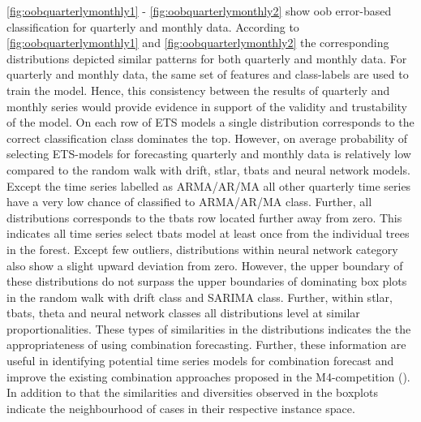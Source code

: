 \documentclass[11pt,a4paper,]{article}
\begin{document}
\autoref{fig:oobquarterlymonthly1} - \autoref{fig:oobquarterlymonthly2}
show oob error-based classification for quarterly and monthly data.
According to \autoref{fig:oobquarterlymonthly1} and
\autoref{fig:oobquarterlymonthly2} the corresponding distributions
depicted similar patterns for both quarterly and monthly data. For
quarterly and monthly data, the same set of features and class-labels
are used to train the model. Hence, this consistency between the results
of quarterly and monthly series would provide evidence in support of the
validity and trustability of the model. On each row of ETS models a
single distribution corresponds to the correct classification class
dominates the top. However, on average probability of selecting
ETS-models for forecasting quarterly and monthly data is relatively low
compared to the random walk with drift, stlar, tbats and neural network
models. Except the time series labelled as ARMA/AR/MA all other
quarterly time series have a very low chance of classified to ARMA/AR/MA
class. Further, all distributions corresponds to the tbats row located
further away from zero. This indicates all time series select tbats
model at least once from the individual trees in the forest. Except few
outliers, distributions within neural network category also show a
slight upward deviation from zero. However, the upper boundary of these
distributions do not surpass the upper boundaries of dominating box
plots in the random walk with drift class and SARIMA class. Further,
within stlar, tbats, theta and neural network classes all distributions
level at similar proportionalities. These types of similarities in the
distributions indicates the the appropriateness of using combination
forecasting. Further, these information are useful in identifying
potential time series models for combination forecast and improve the
existing combination approaches proposed in the M4-competition
(\textcite{Makridakis2018dx}). In addition to that the similarities and
diversities observed in the boxplots indicate the neighbourhood of cases
in their respective instance space.
\end{document}
